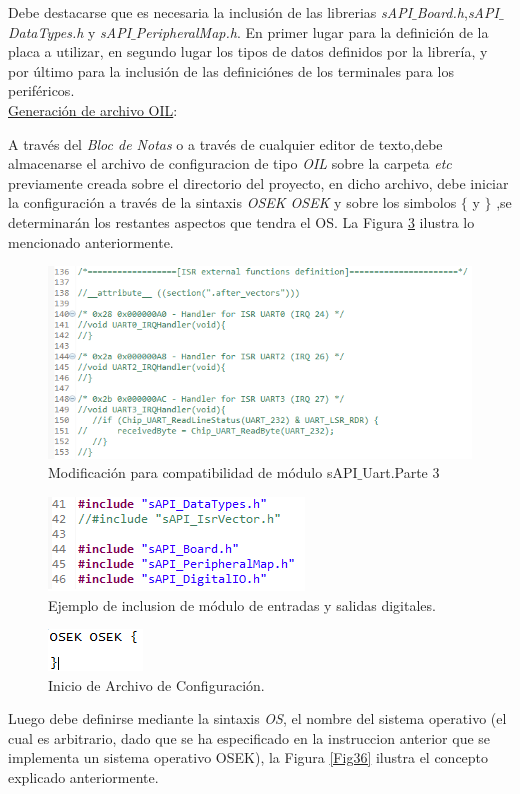 \documentclass[12pt,letterpaper]{article}
\begin{document}
Debe destacarse que es necesaria la inclusión de las librerias \textit{sAPI$\_$Board.h},\textit{sAPI$\_$DataTypes.h} y \textit{sAPI$\_$PeripheralMap.h}. En primer lugar para la definición de la placa a utilizar, en segundo lugar los tipos de datos definidos por la librería, y por último para la inclusión de las definiciónes de los terminales para los periféricos.\\
\underline{Generación de archivo OIL}:

A través del \textit{Bloc de Notas} o a través de cualquier editor de texto,debe almacenarse el archivo de configuracion de tipo \textit{OIL} sobre la carpeta \textit{etc} previamente creada sobre el directorio del proyecto, en dicho archivo, debe iniciar la configuración a través de la sintaxis \textit{OSEK OSEK} y sobre los simbolos $\lbrace$ y $\rbrace$ ,se determinarán los restantes aspectos que tendra el OS. La Figura \ref{Fig35} ilustra lo mencionado anteriormente.
\begin{figure}[!h]
\centering
\includegraphics[width=9 cm]{figuras/f31.png}
\caption{Modificación para compatibilidad de módulo sAPI$\_$Uart.Parte 3}
\label{modificacionuart3}
\end{figure}

\begin{figure}[!h]
\centering
\includegraphics[width=6 cm]{figuras/f32.png}
\caption{Ejemplo de inclusion de módulo de entradas y salidas digitales.}
\label{ejemploinclusion}
\end{figure}

\begin{center}
\begin{figure}[!h]
\centering
\includegraphics[width=5 cm]{figuras/f18.png}
\caption{Inicio de Archivo de Configuración.}
\label{Fig35}
\end{figure}
\end{center}
Luego debe definirse mediante la sintaxis \textit{OS}, el nombre del sistema operativo (el cual es arbitrario, dado que se ha especificado en la instruccion anterior que se implementa un sistema operativo OSEK), la Figura \ref{Fig36} ilustra el concepto explicado anteriormente.
\end{document}
